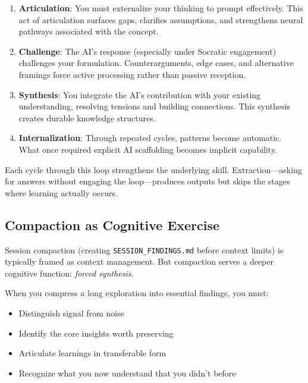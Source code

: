 \begin{enumerate}
    \item \textbf{Articulation}: You must externalize your thinking to prompt effectively. This act of articulation surfaces gaps, clarifies assumptions, and strengthens neural pathways associated with the concept.

    \item \textbf{Challenge}: The AI's response (especially under Socratic engagement) challenges your formulation. Counterarguments, edge cases, and alternative framings force active processing rather than passive reception.

    \item \textbf{Synthesis}: You integrate the AI's contribution with your existing understanding, resolving tensions and building connections. This synthesis creates durable knowledge structures.

    \item \textbf{Internalization}: Through repeated cycles, patterns become automatic. What once required explicit AI scaffolding becomes implicit capability.
\end{enumerate}

Each cycle through this loop strengthens the underlying skill. Extraction---asking for answers without engaging the loop---produces outputs but skips the stages where learning actually occurs.

\subsection{Compaction as Cognitive Exercise}

Session compaction (creating \texttt{SESSION\_FINDINGS.md} before context limits) is typically framed as context management. But compaction serves a deeper cognitive function: \emph{forced synthesis}.

When you compress a long exploration into essential findings, you must:

\begin{itemize}
    \item Distinguish signal from noise
    \item Identify the core insights worth preserving
    \item Articulate learnings in transferable form
    \item Recognize what you now understand that you didn't before
\end{itemize}

